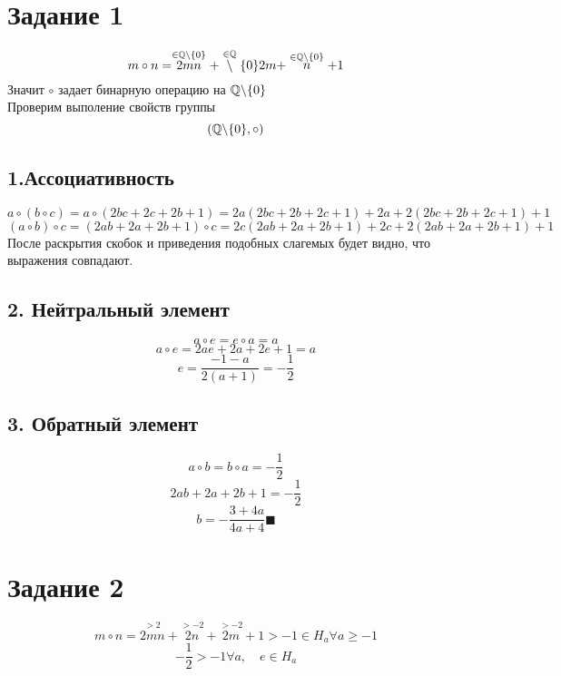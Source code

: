 

	\section*{Задание 1}
	$$m\circ n = \stackrel{\in \mathbb{Q}\backslash\{0\}}{2mn}+ \stackrel{\in \mathbb{Q}}\backslash\{0\}{2m}  + \stackrel{\in \mathbb{Q}\backslash\{0\}}{n} +1 $$ Значит $\circ$ задает бинарную операцию на $\mathbb{Q}\backslash\{0\}$\\
	Проверим выполение свойств группы $$(\mathbb{Q}\backslash\{0\},\circ)$$
	\subsection*{1.Ассоциативность}
	$$a\circ(b\circ c) = a\circ(2bc+2c+2b + 1) = 2a(2bc+2b+2c+1) + 2a + 2(2bc+2b+ 2c + 1) + 1$$
	$$(a\circ b)\circ c = (2ab+ 2a + 2b+ 1)\circ c = 2c(2ab+ 2a + 2b+ 1) + 2c + 2(2ab+ 2a + 2b+ 1) + 1$$
	После раскрытия скобок и приведения подобных слагемых будет видно, что выражения совпадают.
	\subsection*{2. Нейтральный элемент}
	$$a\circ e = e\circ a = a$$
	$$a \circ e = 2 ae + 2a + 2e + 1 = a$$
	$$e = \frac{-1-a}{2(a+1)}= -\frac12$$
	\subsection*{3. Обратный элемент}
	$$a\circ b = b\circ a = -\frac12$$
	$$2ab + 2a+ 2b+ 1 = -\frac12$$
	$$b = -\frac{3+4a}{4a+4}\blacksquare$$
	\section*{Задание 2}
	$$m\circ n = \stackrel{>2}{2mn} + \stackrel{>-2}{2n}+ \stackrel{>-2}{2m} + 1> -1\in H_a \forall a \geq -1$$
	$$-\frac12>-1 \forall a,\quad e \in H_a$$
	$$$$
